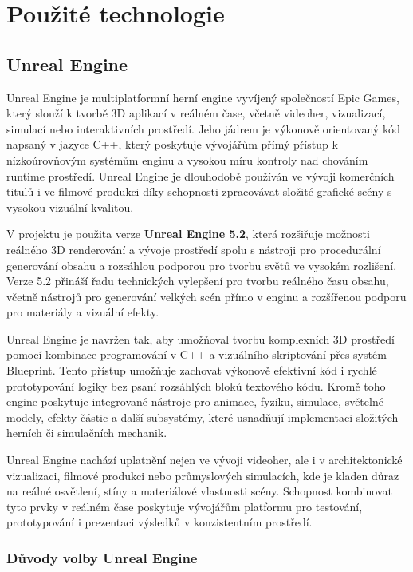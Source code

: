 \section{Použité technologie}
\subsection{Unreal Engine}

Unreal Engine\cite{Unreal2025} je multiplatformní herní engine vyvíjený společností Epic Games, který slouží k tvorbě 3D aplikací v reálném čase, včetně videoher, vizualizací, simulací nebo interaktivních prostředí. Jeho jádrem je výkonově orientovaný kód napsaný v jazyce C++, který poskytuje vývojářům přímý přístup k nízkoúrovňovým systémům enginu a vysokou míru kontroly nad chováním runtime prostředí. Unreal Engine je dlouhodobě používán ve vývoji komerčních titulů i ve filmové produkci díky schopnosti zpracovávat složité grafické scény s vysokou vizuální kvalitou.

V projektu je použita verze \textbf{Unreal Engine 5.2}, která rozšiřuje možnosti reálného 3D renderování a vývoje prostředí spolu s nástroji pro procedurální generování obsahu a rozsáhlou podporou pro tvorbu světů ve vysokém rozlišení. Verze 5.2 přináší řadu technických vylepšení pro tvorbu reálného času obsahu, včetně nástrojů pro generování velkých scén přímo v enginu a rozšířenou podporu pro materiály a vizuální efekty.

Unreal Engine je navržen tak, aby umožňoval tvorbu komplexních 3D prostředí pomocí kombinace programování v C++ a vizuálního skriptování přes systém Blueprint. Tento přístup umožňuje zachovat výkonově efektivní kód i rychlé prototypování logiky bez psaní rozsáhlých bloků textového kódu. Kromě toho engine poskytuje integrované nástroje pro animace, fyziku, simulace, světelné modely, efekty částic a další subsystémy, které usnadňují implementaci složitých herních či simulačních mechanik.

Unreal Engine nachází uplatnění nejen ve vývoji videoher, ale i v architektonické vizualizaci, filmové produkci nebo průmyslových simulacích, kde je kladen důraz na reálné osvětlení, stíny a materiálové vlastnosti scény. Schopnost kombinovat tyto prvky v reálném čase poskytuje vývojářům platformu pro testování, prototypování i prezentaci výsledků v konzistentním prostředí.

\subsubsection{Důvody volby Unreal Engine}

